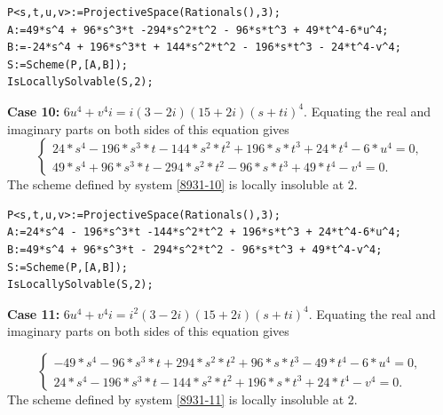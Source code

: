 \documentclass[a4paper,12pt,english,reqno]{amsart}
\begin{document}
\begin{lstlisting}
P<s,t,u,v>:=ProjectiveSpace(Rationals(),3);
A:=49*s^4 + 96*s^3*t -294*s^2*t^2 - 96*s*t^3 + 49*t^4-6*u^4;
B:=-24*s^4 + 196*s^3*t + 144*s^2*t^2 - 196*s*t^3 - 24*t^4-v^4;
S:=Scheme(P,[A,B]);
IsLocallySolvable(S,2);
\end{lstlisting}

{\bf Case 10:} $6u^4+v^4i=i(3-2i)(15+2i)(s+ti)^4$. Equating the real and imaginary parts on both sides of this equation gives
\begin{equation}\label{8931-10}
\begin{cases}
24*s^4 - 196*s^3*t - 144*s^2*t^2 + 196*s*t^3 + 24*t^4 - 6*u^4=0,\\
49*s^4 + 96*s^3*t - 294*s^2*t^2 - 96*s*t^3 + 49*t^4 - v^4=0.
\end{cases}
\end{equation}
The scheme defined by system \eqref{8931-10} is locally insoluble at $2$.

\begin{lstlisting}
P<s,t,u,v>:=ProjectiveSpace(Rationals(),3);
A:=24*s^4 - 196*s^3*t -144*s^2*t^2 + 196*s*t^3 + 24*t^4-6*u^4;
B:=49*s^4 + 96*s^3*t - 294*s^2*t^2 - 96*s*t^3 + 49*t^4-v^4;
S:=Scheme(P,[A,B]);
IsLocallySolvable(S,2);
\end{lstlisting}
{\bf Case 11:} $6u^4+v^4i=i^2(3-2i)(15+2i)(s+ti)^4$.  Equating the real and imaginary parts on both sides of this equation gives

\begin{equation}\label{8931-11}
\begin{cases}
-49*s^4 - 96*s^3*t + 294*s^2*t^2 + 96*s*t^3 - 49*t^4 - 6*u^4=0,\\
24*s^4 - 196*s^3*t - 144*s^2*t^2 + 196*s*t^3 + 24*t^4 - v^4=0.
\end{cases}
\end{equation}
The scheme defined by system \eqref{8931-11} is locally insoluble at $2$.
\end{document}
